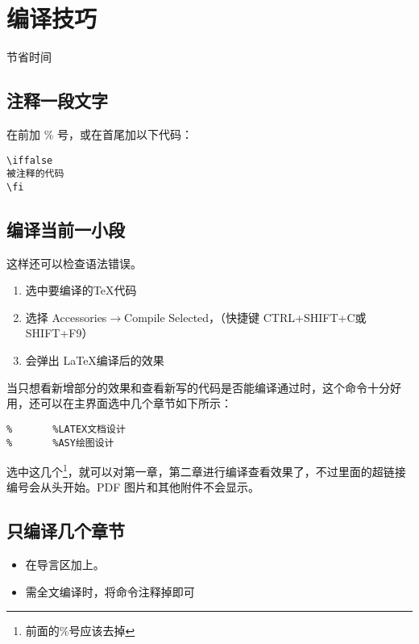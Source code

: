 \section{编译技巧}
节省时间
\subsection{注释一段文字}
在前加 \% 号，或在首尾加以下代码：
\begin{shaded}
\begin{Verbatim}
\iffalse
被注释的代码
\fi
\end{Verbatim}
\end{shaded}

\subsection{编译当前一小段}
这样还可以检查语法错误。
\begin{enumerate}
  \item 选中要编译的\TeX 代码
  \item 选择 Accessories$\rightarrow$Compile Selected，（快捷键 CTRL+SHIFT+C或SHIFT+F9）
  \item 会弹出 \LaTeX 编译后的效果
\end{enumerate}
\color{red}
当只想看新增部分的效果和查看新写的代码是否能编译通过时，这个命令十分好用，还可以在主界面选中几个章节如下所示：
\begin{shaded}
\begin{Verbatim}
%       %LATEX文档设计
%       %ASY绘图设计
\end{Verbatim}
\end{shaded}

选中这几个\footnote{前面的\%号应该去掉}，就可以对第一章，第二章进行编译查看效果了，不过里面的超链接编号会从头开始。PDF 图片和其他附件不会显示。
\color{black}

\subsection{只编译几个章节}

\begin{itemize}
  \item 在导言区加上。
  \item 需全文编译时，将命令注释掉即可
\end{itemize}

